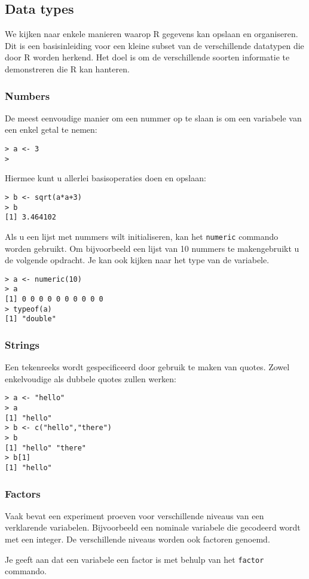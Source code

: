 \subsection{Data types}
We kijken naar enkele manieren waarop R gegevens kan opslaan en organiseren. Dit is een basisinleiding voor een kleine subset van de verschillende datatypen die door R worden herkend. Het doel is om de verschillende soorten informatie te demonstreren die R kan hanteren. 

\subsubsection{Numbers}
De meest eenvoudige manier om een nummer op te slaan is om een variabele van een enkel getal te nemen:
\begin{lstlisting}
> a <- 3
>
\end{lstlisting}
Hiermee kunt u allerlei basisoperaties doen en opslaan:
\begin{lstlisting}
> b <- sqrt(a*a+3)
> b
[1] 3.464102
\end{lstlisting}
Als u een lijst met nummers wilt initialiseren, kan het \texttt{numeric} commando worden gebruikt. Om bijvoorbeeld een lijst van 10 nummers te makengebruikt u de volgende opdracht. Je kan ook kijken naar het type van de variabele.
\begin{lstlisting}
> a <- numeric(10)
> a
[1] 0 0 0 0 0 0 0 0 0 0
> typeof(a)
[1] "double"
\end{lstlisting}

\subsubsection{Strings}
Een tekenreeks wordt gespecificeerd door gebruik te maken van quotes. Zowel enkelvoudige als dubbele quotes zullen werken:
\begin{lstlisting}
> a <- "hello"
> a
[1] "hello"
> b <- c("hello","there")
> b
[1] "hello" "there"
> b[1]
[1] "hello"
\end{lstlisting}

\subsubsection{Factors}
 Vaak bevat een experiment proeven voor verschillende niveaus van een  verklarende variabelen. Bijvoorbeeld een nominale variabele die gecodeerd wordt met een integer. De verschillende niveaus worden ook factoren genoemd.

Je geeft aan dat een variabele een factor is met behulp van het \texttt{factor} commando. 

